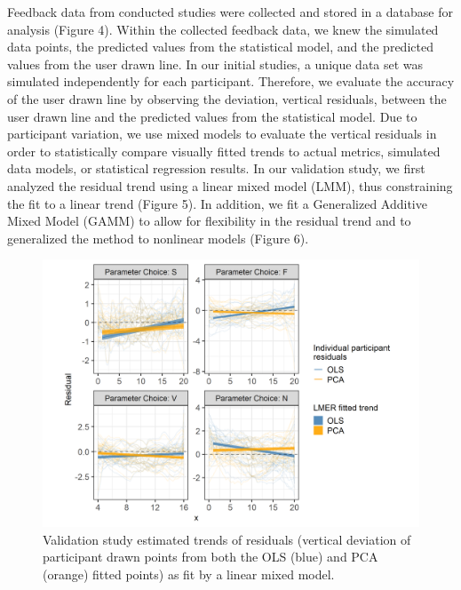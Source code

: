 \documentclass[10pt]{article}
\begin{document}
Feedback data from conducted studies were collected and stored in a
database for analysis (Figure 4). Within the collected feedback data, we
knew the simulated data points, the predicted values from the
statistical model, and the predicted values from the user drawn line. In
our initial studies, a unique data set was simulated independently for
each participant. Therefore, we evaluate the accuracy of the user drawn
line by observing the deviation, vertical residuals, between the user
drawn line and the predicted values from the statistical model. Due to
participant variation, we use mixed models to evaluate the vertical
residuals in order to statistically compare visually fitted trends to
actual metrics, simulated data models, or statistical regression
results. In our validation study, we first analyzed the residual trend
using a linear mixed model (LMM), thus constraining the fit to a linear
trend (Figure 5). In addition, we fit a Generalized Additive Mixed Model
(GAMM) to allow for flexibility in the residual trend and to generalized
the method to nonlinear models (Figure 6).

\begin{figure}[ht]
\begin{center}
\centerline{\includegraphics[width=\columnwidth]{images/eyefitting-lmer-plot}}
\caption{Validation study estimated trends of residuals (vertical deviation of participant drawn points from both the OLS (blue) and PCA (orange) fitted points) as fit by a linear mixed model.}
\label{eyefitting-lmer-plot}
\end{center}
\end{figure}
\end{document}
